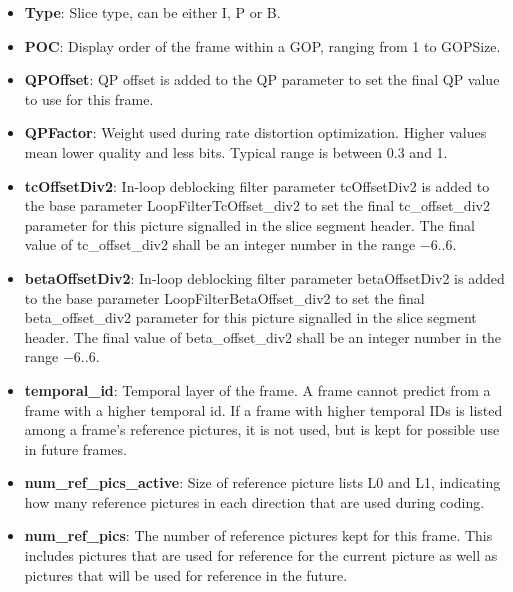 \documentclass[a4paper,11pt]{jctvcdoc}
\begin{document}
\begin{itemize}
    \item[]\textbf{Type}: Slice type, can be either I, P or B.

    \item[]\textbf{POC}: Display order of the frame within a GOP, ranging
          from 1 to GOPSize.

    \item[]\textbf{QPOffset}: QP offset is added to the QP parameter to set
          the final QP value to use for this frame.

    \item[]\textbf{QPFactor}: Weight used during rate distortion
          optimization. Higher values mean lower quality and less bits. Typical
          range is between
          0.3 and 1.

    \item[]\textbf{tcOffsetDiv2}: In-loop deblocking filter parameter tcOffsetDiv2
          is added to the base parameter LoopFilterTcOffset_div2 to set the final tc_offset_div2
          parameter for this picture signalled in the slice segment header. The final
          value of tc_offset_div2 shall be an integer number in the range $-6..6$.

    \item[]\textbf{betaOffsetDiv2}: In-loop deblocking filter parameter betaOffsetDiv2
          is added to the base parameter LoopFilterBetaOffset_div2 to set the final beta_offset_div2
          parameter for this picture signalled in the slice segment header. The final
          value of beta_offset_div2 shall be an integer number in the range $-6..6$.

    \item[]\textbf{temporal_id}: Temporal layer of the frame. A frame cannot
          predict from a frame with a higher temporal id. If a frame with higher
          temporal IDs is listed among a frame's reference pictures, it is
          not used, but is kept for possible use in future frames.

    \item[]\textbf{num_ref_pics_active}: Size of reference picture lists L0
          and L1, indicating how many reference pictures in each direction that
          are used during coding.

    \item[]\textbf{num_ref_pics}: The number of reference pictures kept for
          this frame.  This includes pictures that are used for reference for the
          current picture as well as pictures that will be used for reference in
          the future.


\end{itemize}
\end{document}
